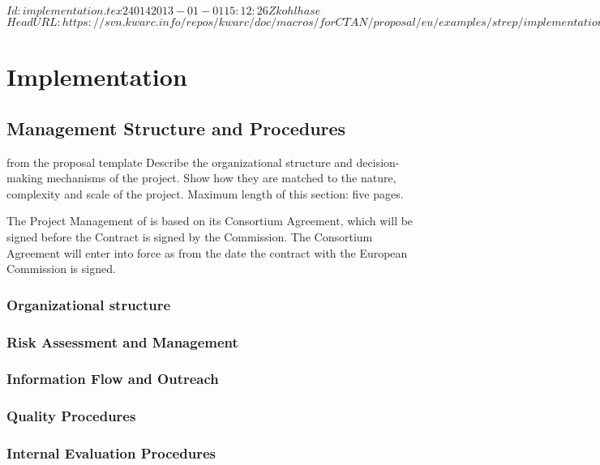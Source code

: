 \svnInfo $Id: implementation.tex 24014 2013-01-01 15:12:26Z kohlhase $
\svnKeyword $HeadURL: https://svn.kwarc.info/repos/kwarc/doc/macros/forCTAN/proposal/eu/examples/strep/implementation.tex $
\chapter{Implementation}\label{chap:implementation}

\section{Management Structure and Procedures}\label{chap:management}
\begin{todo}{from the proposal template}
  Describe the organizational structure and decision-making mechanisms
  of the project. Show how they are matched to the nature, complexity
  and scale of the project.  Maximum length of this section: five pages.
\end{todo}

The Project Management of {\pn} is based on its Consortium Agreement, which will be
signed before the Contract is signed by the Commission. The Consortium Agreement will
enter into force as from the date the contract with the European Commission is signed.
\subsection{Organizational structure}\label{sec:management-structure}
\subsection{Risk Assessment and Management}
\subsection{Information Flow and Outreach}\label{sec:spread-excellence}
\subsection{Quality Procedures}\label{sec:quality-management}
\subsection{Internal Evaluation Procedures}
\newpage
